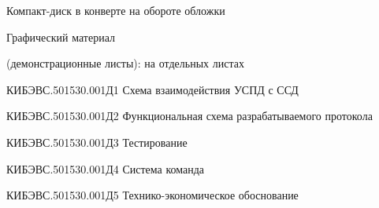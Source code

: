 


 
 
 
 
 \newpage
 \tableofcontents
 
 \noindent\hspace{7.5mm}Компакт-диск \hfill в конверте на обороте обложки
 
 \noindent\hspace{7.5mm}Графический материал
 
 \noindent\hspace{7.5mm}(демонстрационные листы): \hfill на отдельных листах
 
 \noindent\hspace{7.5mm}КИБЭВС.501530.001Д1 Схема взаимодействия УСПД с ССД
 
 \noindent\hspace{7.5mm}КИБЭВС.501530.001Д2 Функциональная схема разрабатываемого протокола

 \noindent\hspace{7.5mm}КИБЭВС.501530.001Д3 Тестирование
 
 \noindent\hspace{7.5mm}КИБЭВС.501530.001Д4 Система команда 
 
 \noindent\hspace{7.5mm}КИБЭВС.501530.001Д5 Технико-экономическое обоснование
 
 
 
 
 
 
 \newpage
 \renewcommand{\refname}{\hfill Список использованных источников \hfill}
 
 
 
 


